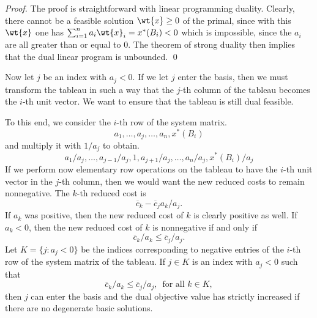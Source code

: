 \begin{proof}
  The proof is straightforward with linear programming duality.
  Clearly, there cannot be a feasible solution $\wt{x}\geq0$ of the
  primal, since with this $\wt{x}$ one has $ \sum_{i=1}^n a_i \wt{x}_i =
  x^*(B_i)<0$ which is impossible, since the $a_i$ are all greater
  than or equal to $0$. The theorem of strong duality then implies
  that the dual linear program is unbounded.  \qed
\end{proof}


Now let $j$ be an index with $a_j<0$. If we let $j$ enter the basis,
then we must transform the tableau in such a way that the $j$-th
column of the tableau becomes the $i$-th unit vector. We want to
ensure that the tableau is still dual feasible. 

To this end, we consider the $i$-th  row of the system matrix. 
\begin{displaymath}
  a_1,\ldots,a_j,\ldots,a_n,x^*(B_i)
\end{displaymath}
and multiply it with $1/a_j$ to obtain. 
\begin{displaymath}
  a_1/a_j,\ldots,a_{j-1}/a_j,1,a_{j+1}/a_j,\ldots,a_n/a_j,x^*(B_i)/a_j
\end{displaymath}
If we perform now elementary row operations on the tableau to have the
$i$-th unit vector in the $j$-th column, then we would want the new
reduced costs to remain nonnegative. The $k$-th reduced cost is 
\begin{displaymath}
  \overline{c}_k - \overline{c}_j a_k/a_j.
\end{displaymath}
If $a_k$ was positive, then the new reduced cost of $k$ is clearly
positive as well. If $a_k<0$, then the new reduced cost of $k$ is
nonnegative if and only if 
\begin{displaymath}
    \overline{c}_k /a_k\leq \overline{c}_j /a_j. 
\end{displaymath}
Let $K = \{j \colon a_j<0\}$ be the indices corresponding to negative
entries of the $i$-th row of the system matrix of the tableau. 
If $j\in K$ is an index with $a_j<0$ such that 
\begin{displaymath}
  \overline{c}_k /a_k\leq \overline{c}_j /a_j ,\, \text{ for all }k \in K,
\end{displaymath}
then $j$ can enter the basis and the dual objective value has strictly
increased if there are no degenerate basic solutions. 

